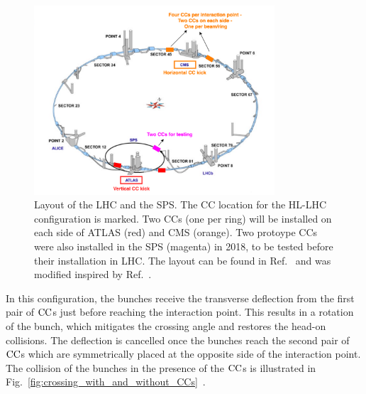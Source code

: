 \begin{figure}[!h] %
    \centering         
    \includegraphics[width=0.8\textwidth]{images/introduction/LHC_layout_CCs.png}
        \caption{Layout of the LHC and the SPS. The CC location for the HL-LHC configuration is marked. Two CCs (one per ring) will be installed on each side of ATLAS (red) and CMS (orange). Two protoype CCs were also installed in the SPS (magenta) in 2018, to be tested before their installation in LHC. The layout can be found in Ref.~\cite{LHC_SPS_layout} and was modified inspired by Ref.~\cite{LHC_SPS_layout_v2}.}
        \label{fig:LHC_layout_CCs}
 \end{figure}

In this configuration, the bunches receive the transverse deflection from the first pair of ${\mathrm{CC}}$s just before reaching the interaction point. This results in a rotation of the bunch, which mitigates the crossing angle and restores the head-on collisions. The deflection is cancelled once the bunches reach the second pair of ${\mathrm{CC}}$s which are symmetrically placed at the opposite side of the interaction point. The collision of the bunches in the presence of the ${\mathrm{CC}}$s is illustrated in Fig.~\ref{fig:crossing_with_and_without_CCs}~\cite{Verdú-Andrés:2263119}.

